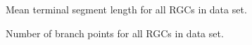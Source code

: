 \documentclass{article}
\begin{document}
\begin{figure}
  \centering
  \caption{Mean terminal segment length for all RGCs in data set.}
\end{figure}

\clearpage

\begin{figure}
  \centering
  \caption{Number of branch points for all RGCs in data set.}
\end{figure}

\clearpage
\end{document}
